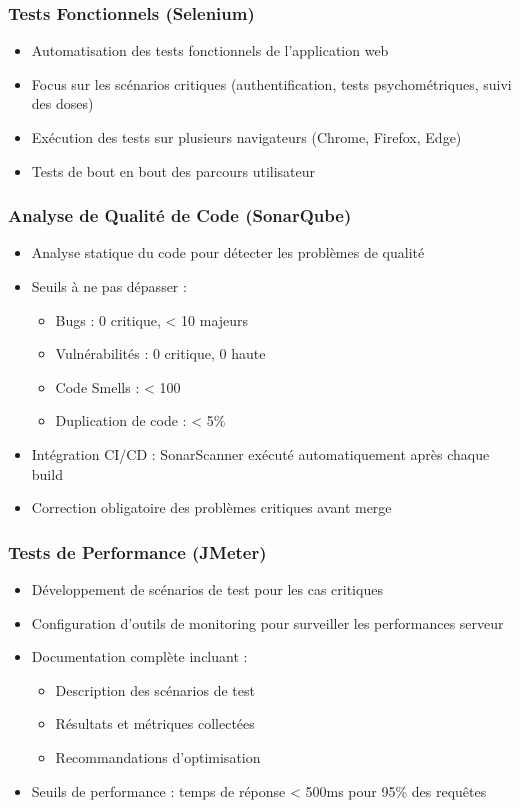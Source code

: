 \documentclass[12pt,a4paper]{report}
\begin{document}
\subsubsection{Tests Fonctionnels (Selenium)}
\begin{itemize}
    \item Automatisation des tests fonctionnels de l'application web
    \item Focus sur les scénarios critiques (authentification, tests psychométriques, suivi des doses)
    \item Exécution des tests sur plusieurs navigateurs (Chrome, Firefox, Edge)
    \item Tests de bout en bout des parcours utilisateur
\end{itemize}

\subsubsection{Analyse de Qualité de Code (SonarQube)}
\begin{itemize}
    \item Analyse statique du code pour détecter les problèmes de qualité
    \item Seuils à ne pas dépasser :
    \begin{itemize}
        \item Bugs : 0 critique, < 10 majeurs
        \item Vulnérabilités : 0 critique, 0 haute
        \item Code Smells : < 100
        \item Duplication de code : < 5\%
    \end{itemize}
    \item Intégration CI/CD : SonarScanner exécuté automatiquement après chaque build
    \item Correction obligatoire des problèmes critiques avant merge
\end{itemize}

\subsubsection{Tests de Performance (JMeter)}
\begin{itemize}
    \item Développement de scénarios de test pour les cas critiques
    \item Configuration d'outils de monitoring pour surveiller les performances serveur
    \item Documentation complète incluant :
    \begin{itemize}
        \item Description des scénarios de test
        \item Résultats et métriques collectées
        \item Recommandations d'optimisation
    \end{itemize}
    \item Seuils de performance : temps de réponse < 500ms pour 95\% des requêtes
\end{itemize}
\end{document}
